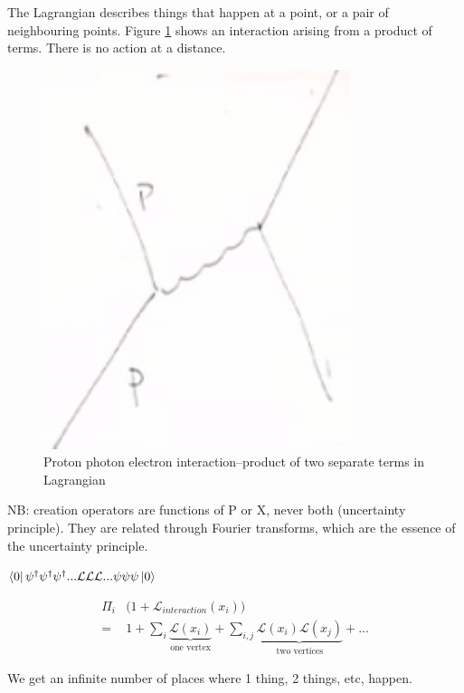 \documentclass[]{article}
\begin{document}
The Lagrangian describes things that happen at a point, or a pair of neighbouring points. Figure \ref{fig:proton:electron:photon} shows an interaction arising from a product of terms. There is no action at a distance.
\begin{figure}[H]
	\caption[Proton photon electron interaction]{Proton photon electron interaction--product of two separate terms in Lagrangian}\label{fig:proton:electron:photon}
	\includegraphics[width=0.8\textwidth]{proton-electron-photon}
\end{figure}

NB: creation operators are functions of P or X, never both (uncertainty principle). They are related through Fourier transforms, which are the essence of the uncertainty principle.

$\bra{0}\psi^\dagger\psi^\dagger\psi^\dagger...\mathcal{L}\mathcal{L}\mathcal{L}...\psi\psi\psi\ket{0}$

\begin{align*}
	\Pi_i& \big(1+\mathcal{L}_{interaction}(x_i)\big)\\
	=&1 + \sum_i \underbrace{ \mathcal{L}(x_i)}_\text{one vertex}  +\sum_{i,j}\underbrace{\mathcal{L}(x_i)\mathcal{L}(x_j)}_\text{two vertices} +...
\end{align*}

We get an infinite number of places where 1 thing, 2 things, etc, happen.
\end{document}
